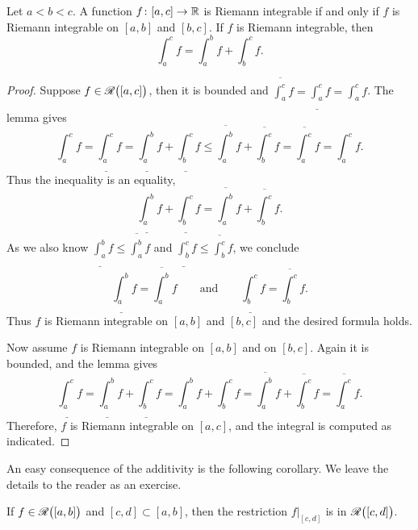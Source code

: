 \begin{prop}
Let $a < b < c$.  A function $f \colon [a,c] \to {\mathbb{R}}$ is Riemann integrable
if and only if $f$ is Riemann integrable on $[a,b]$ and $[b,c]$.  If
$f$ is Riemann integrable, then
\begin{equation*}
\int_a^c f
=
\int_a^b f
+
\int_b^c f .
\end{equation*}
\end{prop}

\begin{proof}
Suppose $f \in {\mathscr{R}}\bigl([a,c]\bigr)$, then it is bounded and
$\overline{\int_a^c} f = 
\underline{\int_a^c} f = 
\int_a^c f$.  The lemma gives
\begin{equation*}
\int_a^c f
=
\underline{\int_a^c} f
 =
\underline{\int_a^b} f + \underline{\int_b^c} f
 \leq
\overline{\int_a^b} f + \overline{\int_b^c} f
 =
\overline{\int_a^c} f
 =
\int_a^c f .
\end{equation*}
Thus the inequality is an equality,
\begin{equation*}
\underline{\int_a^b} f + \underline{\int_b^c} f
=
\overline{\int_a^b} f + \overline{\int_b^c} f .
\end{equation*}
As we also know 
$\underline{\int_a^b} f \leq \overline{\int_a^b} f$
and
$\underline{\int_b^c} f \leq \overline{\int_b^c} f$, we 
conclude 
\begin{equation*}
\underline{\int_a^b} f
=
\overline{\int_a^b} f
\qquad \text{and} \qquad
\underline{\int_b^c} f
=
\overline{\int_b^c} f .
\end{equation*}
Thus $f$ is Riemann integrable on $[a,b]$ and $[b,c]$ and the desired formula
holds.

Now assume $f$ is Riemann integrable on $[a,b]$ and on $[b,c]$.
Again it is bounded, and the lemma gives
\begin{equation*}
\underline{\int_a^c} f
=
\underline{\int_a^b} f + \underline{\int_b^c} f
=
\int_a^b f + \int_b^c f
=
\overline{\int_a^b} f + \overline{\int_b^c} f
=
\overline{\int_a^c} f .
\end{equation*}
Therefore, $f$ is Riemann integrable on $[a,c]$, and the integral is computed
as indicated.
\end{proof}

An easy consequence of the additivity is the following corollary.  We
leave the details to the reader as an exercise.

\begin{cor} \label{intsubcor}
If $f \in {\mathscr{R}}\bigl([a,b]\bigr)$ and
$[c,d] \subset [a,b]$, then
the restriction $f|_{[c,d]}$ is in ${\mathscr{R}}\bigl([c,d]\bigr)$.
\end{cor}

